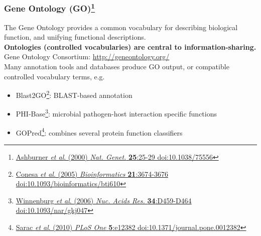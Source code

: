 \begin{frame}
  \frametitle{Gene Ontology (GO)\footnote{\tiny{\href{http://dx.doi.org/10.1038/75556}{Ashburner \textit{et al}. (2000) \textit{Nat. Genet.} \textbf{25}:25-29 doi:10.1038/75556}}}}
  The Gene Ontology provides a common vocabulary for describing biological function, and unifying functional descriptions.\\[0.1cm]
  \textbf{Ontologies (controlled vocabularies) are central to information-sharing.} \\[0.1cm]
  Gene Ontology Consortium: \href{http://geneontology.org/}{http://geneontology.org/} \\[0.1cm]
  Many annotation tools and databases produce GO output, or compatible controlled vocabulary terms, e.g.
  \begin{itemize}
    \item Blast2GO\footnote{\tiny{\href{http://dx.doi.org/10.1093/bioinformatics/bti610}{Conesa \textit{et al}. (2005) \textit{Bioinformatics} \textbf{21}:3674-3676 doi:10.1093/bioinformatics/bti610}}}: BLAST-based annotation
    \item PHI-Base\footnote{\tiny{\href{http://dx.doi.org/10.1093/nar/gkj047}{Winnenburg \textit{et al}. (2006) \textit{Nuc. Acids Res.} \textbf{34}:D459-D464 doi:10.1093/nar/gkj047}}}: microbial pathogen-host interaction specific functions
    \item GOPred\footnote{\tiny{\href{http://dx.doi.org/10.1371/journal.pone.0012382}{Sarac \textit{et al}. (2010) \textit{PLoS One} \textbf{5}:e12382 doi:10.1371/journal.pone.0012382}}}: combines several protein function classifiers
  \end{itemize}
\end{frame}


